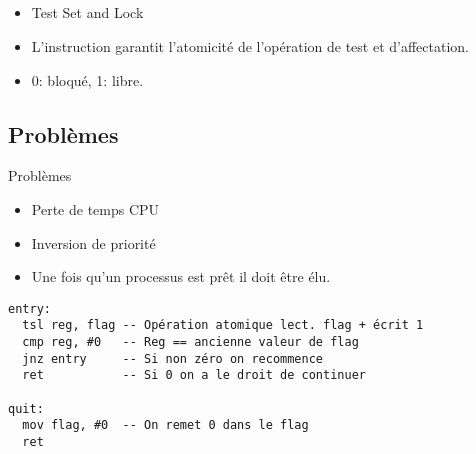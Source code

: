 \subsection{\subsectitle}
\begin{frame}[containsverbatim]{\sectitle}
    \begin{block}{\subsectitle}
        \begin{itemize}
            \item Test Set and Lock
            \item L'instruction garantit l'atomicité de l'opération de test et
                d'affectation.
            \item 0: bloqué, 1: libre.
        \end{itemize}
    \end{block}

    \def\subsectitle{Problèmes}
    \subsection{\subsectitle}
    \begin{block}{\subsectitle}
        \begin{itemize}
            \item Perte de temps CPU
            \item Inversion de priorité
            \item Une fois qu'un processus est prêt il doit être élu.
        \end{itemize}
    \end{block}
\end{frame}

\begin{frame}[containsverbatim]{\sectitle}
\begin{exampleblock}{\subsectitle}
\begin{verbatim}
entry:
  tsl reg, flag -- Opération atomique lect. flag + écrit 1
  cmp reg, #0   -- Reg == ancienne valeur de flag
  jnz entry     -- Si non zéro on recommence
  ret           -- Si 0 on a le droit de continuer

quit:
  mov flag, #0  -- On remet 0 dans le flag
  ret
\end{verbatim}
\end{exampleblock}
\end{frame}

\def\subsectitle{Autres méthodes}
